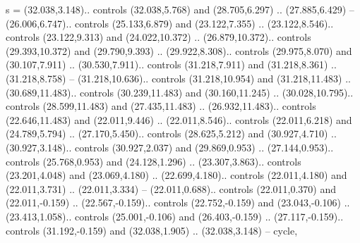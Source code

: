 {s} = {(32.038,3.148).. controls (32.038,5.768) and (28.705,6.297) .. (27.885,6.429) -- (26.006,6.747).. controls (25.133,6.879) and (23.122,7.355) .. (23.122,8.546).. controls (23.122,9.313) and (24.022,10.372) .. (26.879,10.372).. controls (29.393,10.372) and (29.790,9.393) .. (29.922,8.308).. controls (29.975,8.070) and (30.107,7.911) .. (30.530,7.911).. controls (31.218,7.911) and (31.218,8.361) .. (31.218,8.758) -- (31.218,10.636).. controls (31.218,10.954) and (31.218,11.483) .. (30.689,11.483).. controls (30.239,11.483) and (30.160,11.245) .. (30.028,10.795).. controls (28.599,11.483) and (27.435,11.483) .. (26.932,11.483).. controls (22.646,11.483) and (22.011,9.446) .. (22.011,8.546).. controls (22.011,6.218) and (24.789,5.794) .. (27.170,5.450).. controls (28.625,5.212) and (30.927,4.710) .. (30.927,3.148).. controls (30.927,2.037) and (29.869,0.953) .. (27.144,0.953).. controls (25.768,0.953) and (24.128,1.296) .. (23.307,3.863).. controls (23.201,4.048) and (23.069,4.180) .. (22.699,4.180).. controls (22.011,4.180) and (22.011,3.731) .. (22.011,3.334) -- (22.011,0.688).. controls (22.011,0.370) and (22.011,-0.159) .. (22.567,-0.159).. controls (22.752,-0.159) and (23.043,-0.106) .. (23.413,1.058).. controls (25.001,-0.106) and (26.403,-0.159) .. (27.117,-0.159).. controls (31.192,-0.159) and (32.038,1.905) .. (32.038,3.148) -- cycle},
